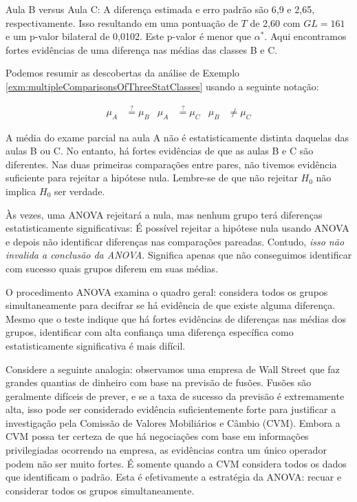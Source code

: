 \documentclass[
]{book}
\theoremstyle{definition}
\theoremstyle{definition}
\theoremstyle{definition}
\theoremstyle{definition}
\theoremstyle{remark}
\begin{document}
Aula B versus Aula C: A diferença estimada e erro padrão são 6,9 e 2,65, respectivamente. Isso resultando em uma pontuação de \(T\) de 2,60 com \(GL= 161\) e um p-valor bilateral de 0,0102. Este p-valor é menor que \(\alpha^*\). Aqui encontramos fortes evidências de uma diferença nas médias das classes B e C.

Podemos resumir as descobertas da análise de Exemplo \ref{exm:multipleComparisonsOfThreeStatClasses} usando a seguinte notação:

\begin{align*}
\mu_A &\stackrel{?}{=} \mu_B
    &\mu_A &\stackrel{?}{=} \mu_C
    &\mu_B &\neq \mu_C
\end{align*}

A média do exame parcial na aula A não é estatisticamente distinta daquelas das aulas B ou C. No entanto, há fortes evidências de que as aulas B e C são diferentes. Nas duas primeiras comparações entre pares, não tivemos evidência suficiente para rejeitar a hipótese nula. Lembre-se de que não rejeitar \(H_0\) não implica \(H_0\) ser verdade.

Às vezes, uma ANOVA rejeitará a nula, mas nenhum grupo terá diferenças estatisticamente significativas: É possível rejeitar a hipótese nula usando ANOVA e depois não identificar diferenças nas comparações pareadas. Contudo, \emph{isso não invalida a conclusão da ANOVA}. Significa apenas que não conseguimos identificar com sucesso quais grupos diferem em suas médias.

O procedimento ANOVA examina o quadro geral: considera todos os grupos simultaneamente para decifrar se há evidência de que existe alguma diferença. Mesmo que o teste indique que há fortes evidências de diferenças nas médias dos grupos, identificar com alta confiança uma diferença específica como estatisticamente significativa é mais difícil.

Considere a seguinte analogia: observamos uma empresa de Wall Street que faz grandes quantias de dinheiro com base na previsão de fusões. Fusões são geralmente difíceis de prever, e se a taxa de sucesso da previsão é extremamente alta, isso pode ser considerado evidência suficientemente forte para justificar a investigação pela Comissão de Valores Mobiliários e Câmbio (CVM). Embora a CVM possa ter certeza de que há negociações com base em informações privilegiadas ocorrendo na empresa, as evidências contra um único operador podem não ser muito fortes. É somente quando a CVM considera todos os dados que identificam o padrão. Esta é efetivamente a estratégia da ANOVA: recuar e considerar todos os grupos simultaneamente.
\end{document}
